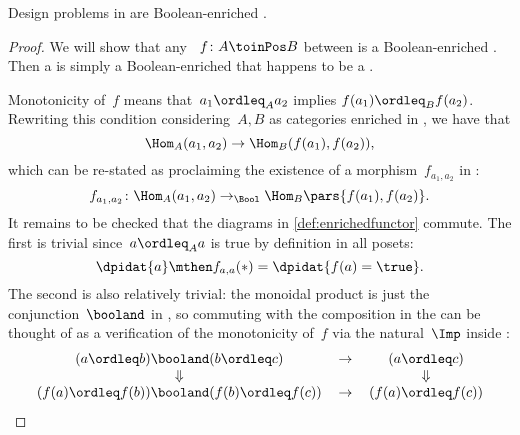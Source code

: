 \begin{proposition}\label{prop:dp-are-boolean-enriched}
    Design problems in \DP are Boolean-enriched .
\end{proposition}
\begin{proof}
    We will show that any ~$f\colon A \toinPos B$ between  is a Boolean-enriched .
    Then a  is simply a Boolean-enriched  that happens to be a .

    Monotonicity of~$f$ means that~$a_1 \ordleq_A a_2$ implies $f(a_1) \ordleq_B f(a_2)$.
    Rewriting this condition considering~$A, B$ as categories enriched in \Bool, we have that
    \begin{equation}
        \Hom_A(a_1, a_2) \to \Hom_B(f(a_1), f(a_2)),
    \end{equation}
    which can be re-stated as proclaiming the existence of a morphism~$f_{a_1, a_2}$ in \Bool:
    \begin{equation}
        f_{a_1, a_2} \colon \Hom_A(a_1, a_2) \to_{\Bool} \Hom_B\pars{f(a_1), f(a_2)}.
    \end{equation}
    It remains to be checked that the diagrams in \cref{def:enrichedfunctor} commute.
    The first is trivial since~$a \ordleq_A a$ is true by definition in all posets:
    \begin{equation}
        \dpidat{a} \mthen f_{a,a} (\ast) = \dpidat{f(a) = \true}.
    \end{equation}
    The second is also relatively trivial: the monoidal product is just the conjunction~$\booland$ in \Bool, so commuting with the composition in the  can be thought of as a verification of the monotonicity of~$f$ via the natural~$\Imp$ inside \Bool:
    \begin{equation}
        \begin{tabular}{ccc}
            $(a \ordleq b) \booland (b \ordleq c)$             & $\to$ & $(a \ordleq c)$ \\
            $\Downarrow$                                       &       & $\Downarrow$ \\
            $(f(a) \ordleq f(b)) \booland (f(b) \ordleq f(c))$ & $\to$ & $(f(a) \ordleq f(c))$
        \end{tabular}
    \end{equation}
\end{proof}

